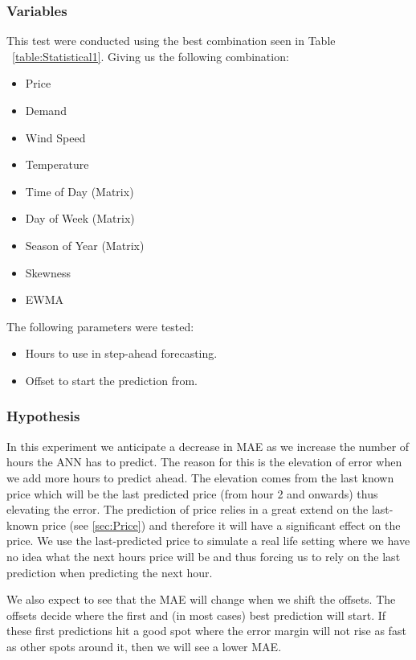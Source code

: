 \subsubsection{Variables}
This test were conducted using the best combination seen in Table ~\ref{table:Statistical1}. Giving us the following combination:
\begin{itemize}
	\item Price
	\item Demand
	\item Wind Speed
	\item Temperature
	\item Time of Day (Matrix)
	\item Day of Week (Matrix)
	\item Season of Year (Matrix)
	\item Skewness
	\item EWMA
\end{itemize}

The following parameters were tested:

\begin{itemize}
	\item Hours to use in step-ahead forecasting.
	\item Offset to start the prediction from.
\end{itemize}

\subsubsection{Hypothesis}
In this experiment we anticipate a decrease in MAE as we increase the number of hours the ANN has to predict. The reason for this is the elevation of error when we add more hours to predict ahead. The elevation comes from the last known price which will be the last predicted price (from hour 2 and onwards) thus elevating the error. The prediction of price relies in a great extend on the last-known price (see \ref{sec:Price}) and therefore it will have a significant effect on the price. We use the last-predicted price to simulate a real life setting where we have no idea what the next hours price will be and thus forcing us to rely on the last prediction when predicting the next hour.

We also expect to see that the MAE will change when we shift the offsets. The offsets decide where the first and (in most cases) best prediction will start. If these first predictions hit a good spot where the error margin will not rise as fast as other spots around it, then we will see a lower MAE.

